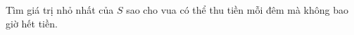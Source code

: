 \documentclass[11pt]{scrartcl}
\begin{document}
\begin{itemize}[label=, leftmargin=0em, itemsep=-0em]
\begin{btvn}
        Tìm giá trị nhỏ nhất của $S$ sao cho vua có thể thu tiền mỗi đêm mà không bao giờ hết tiền.
    \end{btvn}

\end{itemize}
\end{document}
